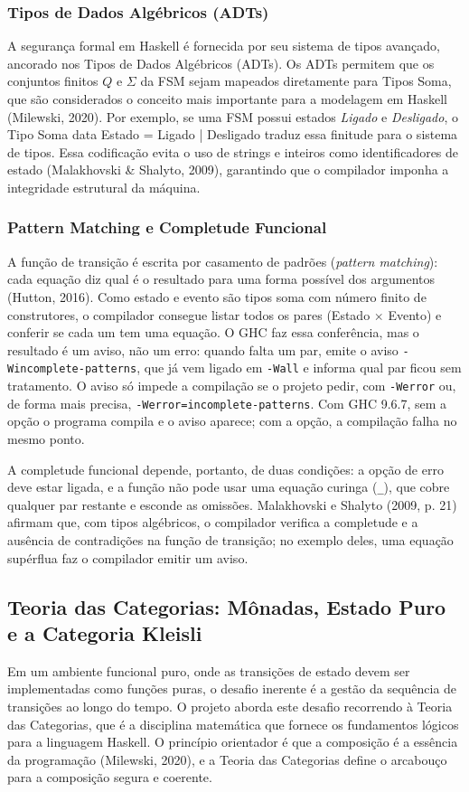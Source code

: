 \documentclass[12pt,a4paper]{article}
\begin{document}
\subsubsection{Tipos de Dados Algébricos (ADTs)}
A segurança formal em Haskell é fornecida por seu sistema de tipos avançado, ancorado nos Tipos de Dados Algébricos (ADTs). Os ADTs permitem que os conjuntos finitos $Q$ e $\Sigma$ da FSM sejam mapeados diretamente para Tipos Soma, que são considerados o conceito mais importante para a modelagem em Haskell (Milewski, 2020). Por exemplo, se uma FSM possui estados \textit{Ligado} e \textit{Desligado}, o Tipo Soma data Estado = Ligado | Desligado traduz essa finitude para o sistema de tipos. Essa codificação evita o uso de strings e inteiros como identificadores de estado (Malakhovski \& Shalyto, 2009), garantindo que o compilador imponha a integridade estrutural da máquina.

\subsubsection{Pattern Matching e Completude Funcional}
A função de transição é escrita por casamento de padrões (\textit{pattern matching}): cada equação diz qual é o resultado para uma forma possível dos argumentos (Hutton, 2016). Como estado e evento são tipos soma com número finito de construtores, o compilador consegue listar todos os pares (Estado $\times$ Evento) e conferir se cada um tem uma equação. O GHC faz essa conferência, mas o resultado é um aviso, não um erro: quando falta um par, emite o aviso \texttt{-Wincomplete-patterns}, que já vem ligado em \texttt{-Wall} e informa qual par ficou sem tratamento. O aviso só impede a compilação se o projeto pedir, com \texttt{-Werror} ou, de forma mais precisa, \texttt{-Werror=incomplete-patterns}. Com GHC 9.6.7, sem a opção o programa compila e o aviso aparece; com a opção, a compilação falha no mesmo ponto.

A completude funcional depende, portanto, de duas condições: a opção de erro deve estar ligada, e a função não pode usar uma equação curinga (\texttt{\_}), que cobre qualquer par restante e esconde as omissões. Malakhovski e Shalyto (2009, p. 21) afirmam que, com tipos algébricos, o compilador verifica a completude e a ausência de contradições na função de transição; no exemplo deles, uma equação supérflua faz o compilador emitir um aviso.

\subsection{Teoria das Categorias: Mônadas, Estado Puro e a Categoria Kleisli}
Em um ambiente funcional puro, onde as transições de estado devem ser implementadas como funções puras, o desafio inerente é a gestão da sequência de transições ao longo do tempo. O projeto aborda este desafio recorrendo à Teoria das Categorias, que é a disciplina matemática que fornece os fundamentos lógicos para a linguagem Haskell. O princípio orientador é que a composição é a essência da programação (Milewski, 2020), e a Teoria das Categorias define o arcabouço para a composição segura e coerente.
\end{document}
